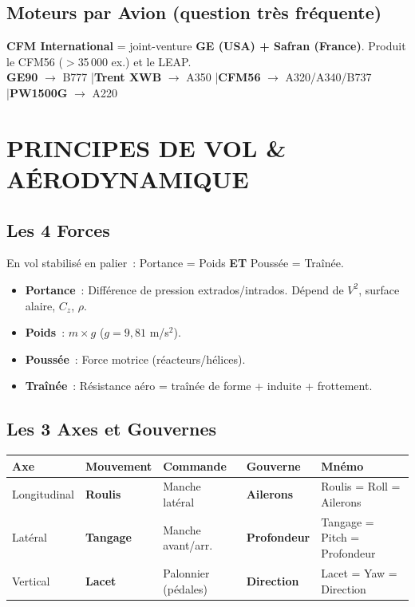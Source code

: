 \documentclass[11pt,a4paper]{article}
\begin{document}
\subsection{Moteurs par Avion (question très fréquente)}

\begin{memobox}
\textbf{CFM International} = joint-venture \textbf{GE (USA) + Safran (France)}. Produit le CFM56 ($>$35\,000 ex.) et le LEAP.\\
\textbf{GE90} $\to$ B777 \quad|\quad \textbf{Trent XWB} $\to$ A350 \quad|\quad \textbf{CFM56} $\to$ A320/A340/B737 \quad|\quad \textbf{PW1500G} $\to$ A220
\end{memobox}

\section{PRINCIPES DE VOL \& AÉRODYNAMIQUE}

\subsection{Les 4 Forces}
En vol stabilisé en palier~: Portance = Poids \textbf{ET} Poussée = Traînée.

\begin{itemize}[nosep]
\item \textbf{Portance}~: Différence de pression extrados/intrados. Dépend de $V^2$, surface alaire, $C_z$, $\rho$.
\item \textbf{Poids}~: $m \times g$ ($g = 9{,}81$ m/s$^2$).
\item \textbf{Poussée}~: Force motrice (réacteurs/hélices).
\item \textbf{Traînée}~: Résistance aéro = traînée de forme + induite + frottement.
\end{itemize}

\subsection{Les 3 Axes et Gouvernes}

\begin{tabular}{p{2.5cm}p{2.5cm}p{2.5cm}p{3cm}p{3.5cm}}
\toprule
\textbf{Axe} & \textbf{Mouvement} & \textbf{Commande} & \textbf{Gouverne} & \textbf{Mnémo} \\
\midrule
Longitudinal & \textbf{Roulis} & Manche latéral & \textbf{Ailerons} & Roulis = Roll = Ailerons \\
Latéral & \textbf{Tangage} & Manche avant/arr. & \textbf{Profondeur} & Tangage = Pitch = Profondeur \\
Vertical & \textbf{Lacet} & Palonnier (pédales) & \textbf{Direction} & Lacet = Yaw = Direction \\
\bottomrule
\end{tabular}
\end{document}
